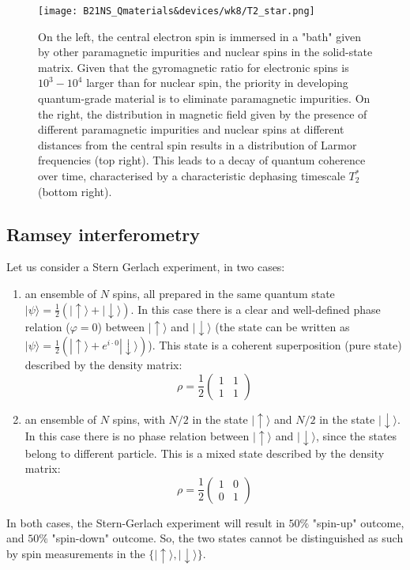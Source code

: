 \documentclass[a4paper,11pt]{article}
\newcommand{\ket}[1]{| #1 \rangle}
\begin{document}
\begin{figure}[h]
\centering
\texttt{[image: B21NS\_Qmaterials\&devices/wk8/T2\_star.png]}
\caption{On the left, the central electron spin is immersed in a "bath" given by other paramagnetic impurities and nuclear spins in the solid-state matrix. Given that the gyromagnetic ratio for electronic spins is $10^3-10^4$ larger than for nuclear spin, the priority in developing quantum-grade material is to eliminate paramagnetic impurities. On the right, the distribution in magnetic field given by the presence of different paramagnetic impurities and nuclear spins at different distances from the central spin results in a distribution of Larmor frequencies (top right). This leads to a decay of quantum coherence over time, characterised by a characteristic dephasing timescale $T_2^*$ (bottom right).}
\label{fig:T2_star}
\end{figure}

\subsection {Ramsey interferometry}
Let us consider a Stern Gerlach experiment, in two cases:
\begin{enumerate}
    \item an ensemble of $N$ spins, all prepared in the same quantum state $\ket{\psi} = \frac{1}{2} (\ket{\uparrow}+\ket{\downarrow})$. In this case there is a clear and well-defined phase relation ($\varphi = 0$) between $\ket{\uparrow}$ and $\ket{\downarrow}$ (the state can be written as $\ket{\psi} = \frac{1}{2} (\ket{\uparrow}+ e^{i \cdot 0}\ket{\downarrow})$). This state is a coherent superposition (pure state) described by the density matrix:
    \begin{equation}
        \rho = \frac{1}{2}\left(\begin{array}{cc}
1 & 1\\
1 & 1\end{array} \right)
    \end{equation}    
    \item an ensemble of $N$ spins, with $N/2$ in the state $\ket{\uparrow}$ and $N/2$ in the state $\ket{\downarrow}$. In this case there is no phase relation between $\ket{\uparrow}$ and $\ket{\downarrow}$, since the states belong to different particle. This is a mixed state described by the density matrix:
    \begin{equation}
        \rho = \frac{1}{2}\left(\begin{array}{cc}
1 & 0\\
0 & 1\end{array} \right)
    \end{equation}    
\end{enumerate}
In both cases, the Stern-Gerlach experiment will result in $50\%$ "spin-up" outcome, and $50\%$ "spin-down" outcome. So, the two states cannot be distinguished as such by spin measurements in the $\lbrace \ket{\uparrow}, \ket{\downarrow} \rbrace$.
\end{document}
